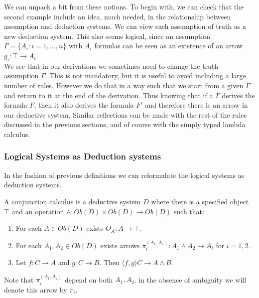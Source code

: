 We can unpack a bit from these notions. To begin with, we can check that the second example include an idea, much needed, in the relationship between assumption and deduction systems. We can view each assumption of truth as a new deduction system. This also seems logical, since an assumption $\Gamma = \{A_i : i=1,...,n\}$  with $A_i$ formulas can be seen as an existence of an arrow $g_i: \top \to A_i$.\\

We see that in our derivations we sometimes need to change the truth-assumption $\Gamma$. This is not mandatory, but it is useful to avoid including a large number of rules. However we do that in a way such that we start from a given $\Gamma$ and return to it at the end of the derivation. Thus knowing that if a $\Gamma$ derives the formula $F$, then it also derives the formula $F'$ and therefore there is an arrow in our deductive system. Similar reflections can be made with the rest of the rules discussed in the previous sections, and of course with the simply typed lambda calculus. \\



\subsubsection{Logical Systems as Deduction systems}
In  the fashion of previous definitions we can reformulate the logical systems as deduction systems.\\
\begin{definition}
  A conjunction calculus is a deductive system $D$ where there is a specified object $\top$ and an operation $\land: Ob(D)\times Ob(D) \to Ob(D)$ such that:
  \begin{enumerate}
  \item For each $A\in Ob(D)$ exists $O_A:A\to \top$.
  \item For each $A_1,A_2\in Ob(D)$ exists arrows $\pi_i^(A_1,A_2): A_1 \land A_2 \to A_i$ for $i=1,2$.
  \item Let $f:C\to A$ and $g:C\to B$. Then $\langle f,g\rangle C\to A\land B$.
  \end{enumerate}
\end{definition}

Note that $\pi_i^(A_1,A_2)$ depend on both $A_1,A_2$. in the absence of ambiguity we will denote this arrow by $\pi_i$.

